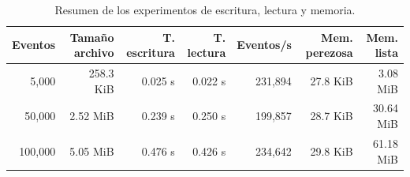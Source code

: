 \begin{table}[t]
\caption{Resumen de los experimentos de escritura, lectura y memoria.}
\label{tab:resumen}
\centering
\footnotesize
\begin{tabular}{rrrrrrr}
\hline
\textbf{Eventos} & \textbf{Tamaño archivo} & \textbf{T. escritura} & \textbf{T. lectura} & \textbf{Eventos/s} & \textbf{Mem. perezosa} & \textbf{Mem. lista} \\
\hline
5{,}000 & 258.3 KiB & 0.025 s & 0.022 s & 231{,}894 & 27.8 KiB & 3.08 MiB \\
50{,}000 & 2.52 MiB & 0.239 s & 0.250 s & 199{,}857 & 28.7 KiB & 30.64 MiB \\
100{,}000 & 5.05 MiB & 0.476 s & 0.426 s & 234{,}642 & 29.8 KiB & 61.18 MiB \\
\hline
\end{tabular}
\end{table}
